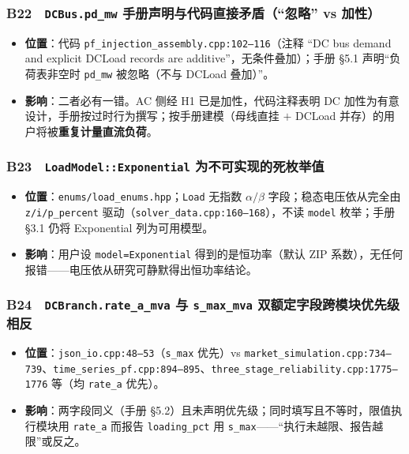 \documentclass[11pt,a4paper,fontset=fandol]{ctexart}
\newcommand{\file}[1]{\texttt{#1}}
\begin{document}
\subsubsection*{B22　\texttt{DCBus.pd\_mw} 手册声明与代码直接矛盾（``忽略'' vs 加性）}
\begin{itemize}
  \item \textbf{位置}：代码 \file{pf\_injection\_assembly.cpp:102--116}（注释 ``DC bus demand and explicit DCLoad records are additive''，无条件叠加）；手册 \S 5.1 声明``负荷表非空时 \texttt{pd\_mw} 被忽略（不与 DCLoad 叠加）''。
  \item \textbf{影响}：二者必有一错。AC 侧经 H1 已是加性，代码注释表明 DC 加性为有意设计，手册按过时行为撰写；按手册建模（母线直挂 $+$ DCLoad 并存）的用户将被\textbf{重复计量直流负荷}。
\end{itemize}

\subsubsection*{B23　\texttt{LoadModel::Exponential} 为不可实现的死枚举值}
\begin{itemize}
  \item \textbf{位置}：\file{enums/load\_enums.hpp}；\texttt{Load} 无指数 $\alpha/\beta$ 字段；稳态电压依从完全由 \texttt{z/i/p\_percent} 驱动（\file{solver\_data.cpp:160--168}），不读 \texttt{model} 枚举；手册 \S 3.1 仍将 Exponential 列为可用模型。
  \item \textbf{影响}：用户设 \texttt{model=Exponential} 得到的是恒功率（默认 ZIP 系数），无任何报错——电压依从研究可静默得出恒功率结论。
\end{itemize}

\subsubsection*{B24　\texttt{DCBranch.rate\_a\_mva} 与 \texttt{s\_max\_mva} 双额定字段跨模块优先级相反}
\begin{itemize}
  \item \textbf{位置}：\file{json\_io.cpp:48--53}（\texttt{s\_max} 优先）vs \file{market\_simulation.cpp:734--739}、\file{time\_series\_pf.cpp:894--895}、\file{three\_stage\_reliability.cpp:1775--1776} 等（均 \texttt{rate\_a} 优先）。
  \item \textbf{影响}：两字段同义（手册 \S 5.2）且未声明优先级；同时填写且不等时，限值执行模块用 \texttt{rate\_a} 而报告 \texttt{loading\_pct} 用 \texttt{s\_max}——``执行未越限、报告越限''或反之。
\end{itemize}
\end{document}

